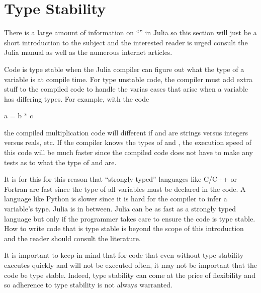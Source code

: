 

\section{Type Stability}
\label{s:type.stable}

There is a large amount of information on ``'' in Julia so this section will just 
be a short introduction to the subject and the interested reader is urged consult the Julia manual 
as well as the numerous internet articles.

Code is type stable when the Julia compiler can figure out what the type of a variable is at compile
time. For type unstable code, the compiler must add extra stuff to the compiled code to handle the
varias cases that arise when a variable has differing types. For example, with the code
\begin{example}
  a = b * c
\end{example}
the compiled multiplication code will different if  and  are strings versus integers versus reals, etc.
If the compiler knows the types of  and , the execution speed of this code will be much
faster since the compiled code does not have to make any tests as to what the type of  and 
are. 

It is for this for this reason that ``strongly typed'' languages like C/C++ or Fortran are fast since
the type of all variables must be  declared in the code. A language like Python is slower since 
it is hard for the compiler to infer a variable's type. Julia is in between. Julia can be as fast as
a strongly typed language but only if the programmer takes care to ensure the code is type stable.
How to write code that is type stable is beyond the scope of this introduction and the reader should
consult the literature.

It is important to keep in mind that for code that even without type stability executes quickly and 
will not be executed often, it may not be important that the code be type stable. Indeed,
type stability can come at the price of flexibility and so adherence to type stability is not always warranted.